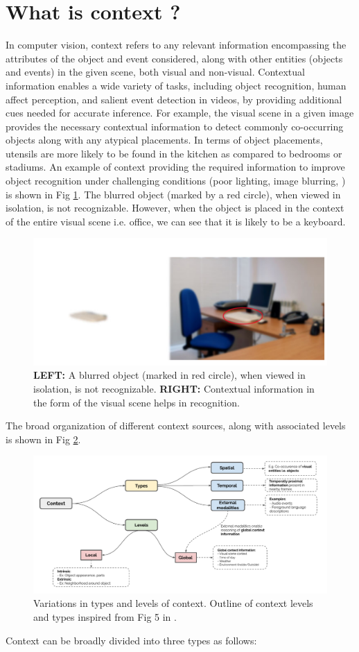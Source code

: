 \section{What is context ?}
In computer vision, context \cite{contextvision} refers to any relevant information encompassing the attributes of the object and event considered, along with other entities (objects and events) in the given scene, both visual and non-visual. Contextual information enables a wide variety of tasks, including object recognition, human affect perception, and salient event detection in videos, by providing additional cues needed for accurate inference. For example, the visual scene in a given image provides the necessary contextual information to detect commonly co-occurring objects along with any atypical placements. In terms of object placements, utensils are more likely to be found in the kitchen as compared to bedrooms or stadiums. An example of context providing the required information to improve object recognition under challenging conditions (poor lighting, image blurring, ) is shown in Fig \ref{object recognition}. The blurred object (marked by a red circle), when viewed in isolation, is not recognizable. However, when the object is placed in the context of the entire visual scene i.e. office, we can see that it is likely to be a keyboard.
\begin{figure}
    \centering 
     \includegraphics[width=0.6\linewidth]{figures/blurred_object.png}
     \caption{ \textbf{LEFT:} A blurred object (marked in red circle), when viewed in isolation, is not recognizable. \textbf{RIGHT:} Contextual information in the form of the visual scene helps in recognition. }
     \label{object recognition}
\end{figure}

The broad organization of different context sources, along with associated levels is shown in Fig \ref{Context_type}.
\begin{figure}[t]
  \centering
  \includegraphics[width=\linewidth]{figures/Context_type.pdf}
  \caption{Variations in types and levels of context. Outline of context levels and types inspired from Fig 5 in \cite{contextvision}.}
  \label{Context_type}
\end{figure}
Context can be broadly divided into three types as follows:

